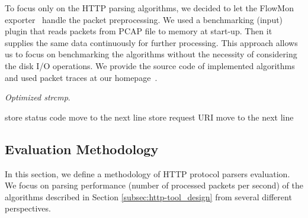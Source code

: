 To focus only on the HTTP parsing algorithms, we decided to let the FlowMon exporter~\cite{FlowmonNetworks--Flowmon} handle the packet preprocessing. We used a  benchmarking (input) plugin that reads packets from PCAP file to memory at start-up. Then it supplies the same data continuously for further processing. This approach allows us to focus on benchmarking the algorithms without the necessity of considering the disk I/O operations. We provide the source code of implemented algorithms and used packet traces at our homepage~\cite{Sima-2013-FlowMon}.

\begin{algorithm}[tb]
\caption{\emph{Optimized strcmp}.}
\label{alg:optimized-strcmp}
{%
\begin{algorithmic}[1]
        \STATE store status code
                \ENDIF
            \ENDFOR
            \STATE move to the next line
        \ENDWHILE
    \ENDIF
        \STATE store request URI
                \ENDIF
            \ENDFOR
            \STATE move to the next line
        \ENDWHILE
    \ENDIF
\end{algorithmic}
}
\end{algorithm}

\subsection{Evaluation Methodology} \label{subsec:http-metodology}

In this section, we define a methodology of HTTP protocol parsers evaluation. We focus on parsing performance (number of processed packets per second) of the algorithms described in Section \ref{subsec:http-tool_design} from several different perspectives.

